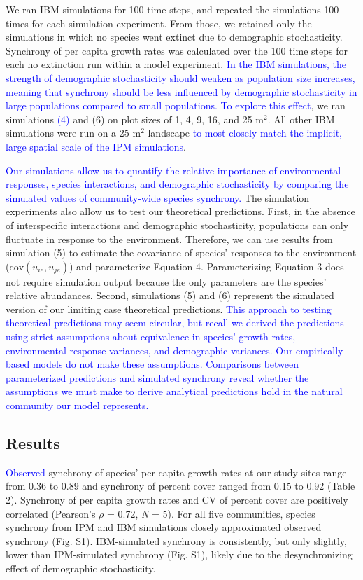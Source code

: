 \documentclass[11pt,]{article}
\begin{document}
We ran IBM simulations for 100 time steps, and repeated the simulations
100 times for each simulation experiment. From those, we retained only
the simulations in which no species went extinct due to demographic
stochasticity. Synchrony of per capita growth rates was calculated over
the 100 time steps for each no extinction run within a model experiment.
\textcolor{blue}{In the IBM simulations, the strength of demographic stochasticity should weaken as population size increases, meaning that synchrony should be less influenced by demographic stochasticity in large populations compared to small populations.
To explore this effect}, we ran simulations \textcolor{blue}{(4)} and
(6) on plot sizes of 1, 4, 9, 16, and 25 \(\text{m}^2\). All other IBM
simulations were run on a 25 \(\text{m}^2\) landscape
\textcolor{blue}{to most closely match the implicit, large spatial scale of the IPM simulations}.

\textcolor{blue}{Our simulations allow us to quantify the relative importance of environmental responses, species interactions, and demographic stochasticity by comparing the simulated values of community-wide species synchrony.}
The simulation experiments also allow us to test our theoretical
predictions. First, in the absence of interspecific interactions and
demographic stochasticity, populations can only fluctuate in response to
the environment. Therefore, we can use results from simulation (5) to
estimate the covariance of species' responses to the environment
(\(\text{cov}(u_{ie}, u_{je})\)) and parameterize Equation 4.
Parameterizing Equation 3 does not require simulation output because the
only parameters are the species' relative abundances. Second,
simulations (5) and (6) represent the simulated version of our limiting
case theoretical predictions.
\textcolor{blue}{This approach to testing theoretical predictions may seem circular, but recall we derived the predictions using strict assumptions about equivalence in species' growth rates, environmental response variances, and demographic variances.
Our empirically-based models do not make these assumptions.
Comparisons between parameterized predictions and simulated synchrony reveal whether the assumptions we must make to derive analytical predictions hold in the natural community our model represents.}

\subsection{Results}

\textcolor{blue}{Observed} synchrony of species' per capita growth rates
at our study sites range from 0.36 to 0.89 and synchrony of percent
cover ranged from 0.15 to 0.92 (Table 2). Synchrony of per capita growth
rates and CV of percent cover are positively correlated (Pearson's
\(\rho\) = 0.72, \emph{N} = 5). For all five communities, species
synchrony from IPM and IBM simulations closely approximated observed
synchrony (Fig. S1). IBM-simulated synchrony is consistently, but only
slightly, lower than IPM-simulated synchrony (Fig. S1), likely due to
the desynchronizing effect of demographic stochasticity.
\end{document}
